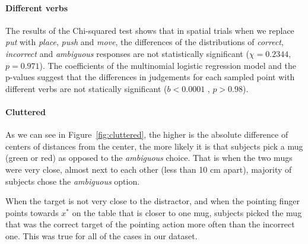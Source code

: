 \paragraph{Different verbs}
The results of the Chi-squared test shows that in spatial trials when we replace \textit{put} with \textit{place}, \textit{push} and \textit{move}, the differences of the distributions of \textit{correct}, \textit{incorrect} and \textit{ambiguous} responses are not statistically significant ($\chi=0.2344 $, $p = 0.971$). The coefficients of the multinomial logistic regression model and the p-values suggest that the differences in judgements for each sampled point with different verbs are not statically significant ($b<0.0001$ , $p>0.98$).



\paragraph{Cluttered}

As we can see in Figure~\ref{fig:cluttered}, the higher is the absolute difference of centers of distances from the center, the more likely it is that subjects pick a mug (green or red) as opposed to the \textit{ambiguous} choice. That is when the two mugs were very close, almost next to each other (less than 10 cm apart), majority of subjects chose the \textit{ambiguous} option. 
 


When the target is not very close to the distractor, and when the pointing finger points towards $x^*$ on the table that is closer to one mug, subjects picked the mug that was the correct target of the pointing action more often than the incorrect one. This was true for all of the cases in our dataset. 


